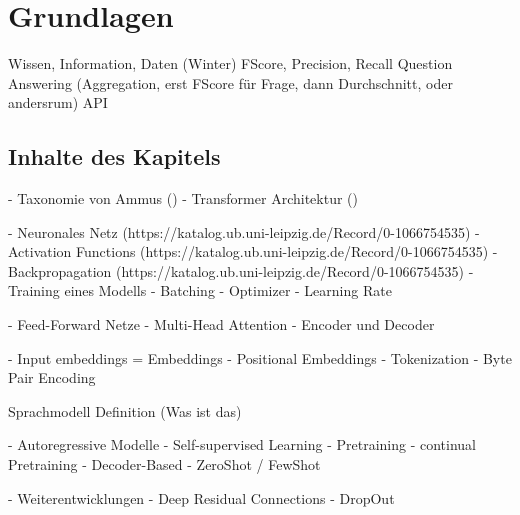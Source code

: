 \chapter{Grundlagen}\label{ch:preliminaries}

Wissen, Information, Daten (Winter)
FScore, Precision, Recall
Question Answering (Aggregation, erst FScore für Frage, dann Durchschnitt, oder andersrum)
API


\section*{Inhalte des Kapitels}
- Taxonomie von Ammus (\citet{ammus})
- Transformer Architektur (\citet{attention})

- Neuronales Netz (https://katalog.ub.uni-leipzig.de/Record/0-1066754535)
- Activation Functions (https://katalog.ub.uni-leipzig.de/Record/0-1066754535)
- Backpropagation (https://katalog.ub.uni-leipzig.de/Record/0-1066754535)
- Training eines Modells
    - Batching
    - Optimizer
    - Learning Rate

- Feed-Forward Netze
- Multi-Head Attention
- Encoder und Decoder

- Input embeddings = Embeddings
- Positional Embeddings
- Tokenization
    - Byte Pair Encoding


Sprachmodell Definition (Was ist das)

- Autoregressive Modelle
    - Self-supervised Learning
    - Pretraining
    - continual Pretraining
    - Decoder-Based
    - ZeroShot / FewShot

- Weiterentwicklungen
    - Deep Residual Connections
    - DropOut


